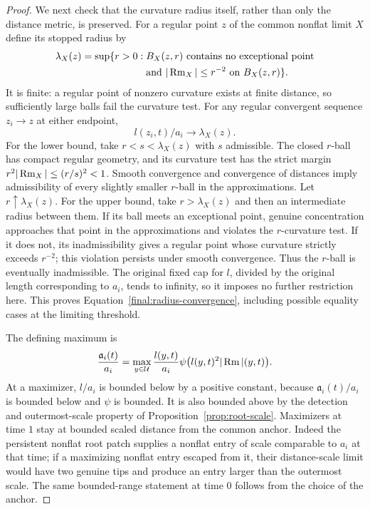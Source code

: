 \begin{proof}
We next check that the curvature radius itself, rather than only
the distance metric, is preserved.  For a regular point $z$ of the
common nonflat limit $X$ define its stopped radius by
\begin{equation}\label{final:stopped-radius}
\begin{split}
 \lambda_X(z)=\sup\{r>0:\;&B_X(z,r)\text{ contains no exceptional point}\\
                       &\text{and }|\operatorname{Rm}_X|\le r^{-2}\text{ on }B_X(z,r)\}.
\end{split}
\end{equation}
It is finite: a regular point of nonzero curvature exists at finite
distance, so sufficiently large balls fail the curvature test.
For any regular convergent sequence $z_i\to z$ at either endpoint,
\begin{equation}\label{final:radius-convergence}
                         l(z_i,t)/a_i\longrightarrow\lambda_X(z).
\end{equation}
For the lower bound, take $r<s<\lambda_X(z)$ with $s$ admissible.
The closed $r$-ball has compact regular geometry, and its curvature
test has the strict margin $r^2|\operatorname{Rm}_X|\le(r/s)^2<1$.
Smooth convergence and convergence of distances imply admissibility
of every slightly smaller $r$-ball in the approximations.  Let
$r\uparrow\lambda_X(z)$.  For the upper bound, take
$r>\lambda_X(z)$ and then an intermediate radius between them.
If its ball meets an exceptional point, genuine concentration
approaches that point in the approximations and violates the
$r$-curvature test.  If it does not, its inadmissibility gives a
regular point whose curvature strictly exceeds $r^{-2}$; this
violation persists under smooth convergence.  Thus the $r$-ball
is eventually inadmissible.  The original fixed cap for $l$, divided
by the original length corresponding to $a_i$, tends to infinity,
so it imposes no further restriction here.  This proves
Equation~\eqref{final:radius-convergence}, including possible
equality cases at the limiting threshold.

The defining maximum is
\[
 \frac{\mathfrak a_i(t)}{a_i}
 =\max_{y\in\mathcal U}
   \frac{l(y,t)}{a_i}
       \psi\bigl(l(y,t)^2|\operatorname{Rm}|(y,t)\bigr).
\]
At a maximizer, $l/a_i$ is bounded below by a positive constant,
because $\mathfrak a_i(t)/a_i$ is bounded below and $\psi$ is bounded.
It is also bounded above by the detection and outermost-scale
property of Proposition~\ref{prop:root-scale}.  Maximizers at time
$1$ stay at bounded scaled distance from the common anchor.  Indeed
the persistent nonflat root patch supplies a nonflat entry of scale
comparable to $a_i$ at that time; if a maximizing nonflat entry
escaped from it, their distance-scale limit would have two genuine
tips and produce an entry larger than the outermost scale.  The
same bounded-range statement at time $0$ follows from the choice
of the anchor.


\end{proof}
